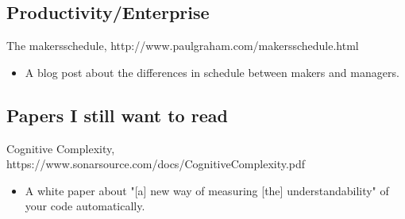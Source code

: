 \documentclass{article}
\begin{document}
\subsection{Productivity/Enterprise}
The makersschedule, http://www.paulgraham.com/makersschedule.html
\begin{itemize}
\item A blog post about the differences in schedule between makers and managers.
\end{itemize} 

\subsection{Papers I still want to read}
Cognitive Complexity, https://www.sonarsource.com/docs/CognitiveComplexity.pdf
\begin{itemize}
\item A white paper about "[a] new way of measuring [the] understandability" of your code automatically.
\end{itemize} 



\end{document}
